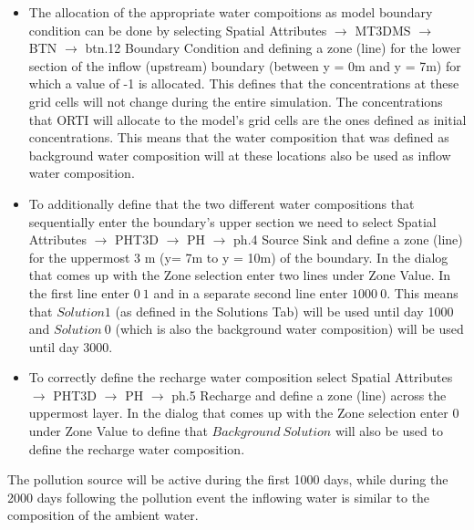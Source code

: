 \begin{itemize}
\item The allocation of the appropriate water compoitions as model boundary condition can be
done by selecting {\color{blue}Spatial Attributes} $\rightarrow$ {\color{blue}MT3DMS} $\rightarrow$ {\color{blue}BTN} $\rightarrow$ {\color{blue}btn.12 Boundary Condition} and defining a zone (line)
for the lower section of the inflow (upstream) boundary (between y = 0m and y = 7m)
for which a value of -1 is allocated. This defines that the concentrations at these grid cells 
will not change during the entire simulation. The concentrations that ORTI will allocate to the 
model's grid cells are the ones defined as initial concentrations. 
This means that the water composition that was defined as background
water composition will at these locations also be used as inflow water composition. 

\item To additionally define that the two different water compositions
that sequentially enter the boundary's upper section we need to 
select {\color{blue}Spatial Attributes} $\rightarrow$ {\color{blue}PHT3D} $\rightarrow$ {\color{blue}PH} $\rightarrow$ {\color{blue}ph.4 Source \/ Sink} and define a zone (line) for the uppermost 3 m (y= 7m to y = 10m)
of the boundary. In the dialog that comes up with the {\color{blue}Zone} selection
enter two lines under {\color{blue}Zone Value}.
In the first line enter $0\ 1$ and in a separate second line enter
$1000\ 0$. This means that $Solution 1$ (as defined in the {\color{blue}Solutions} Tab) 
will be used until day 1000 and $Solution\ 0$ (which is also the background water composition) 
will be used until day 3000.

\item To correctly define the recharge water composition 
select {\color{blue}Spatial Attributes} $\rightarrow$ {\color{blue}PHT3D} $\rightarrow$ {\color{blue}PH} $\rightarrow$ {\color{blue}ph.5 Recharge} and define a zone (line) across the uppermost layer. 
In the dialog that comes up with the {\color{blue}Zone} selection
enter 0 under {\color{blue}Zone Value} to define that $Background\ Solution$ 
will also be used to define the recharge water composition.

\end{itemize}

The pollution source will be active during the first 1000 days, while 
during the 2000 days following the pollution event the inflowing water is similar 
to the composition of the ambient water.


